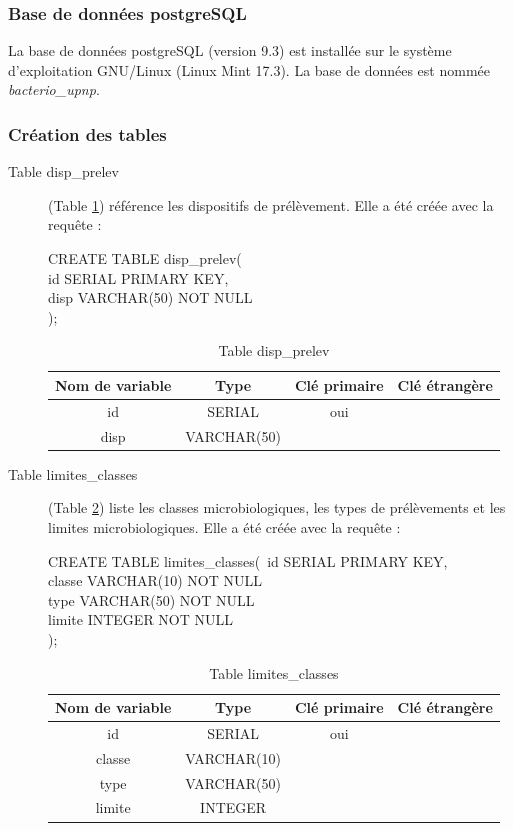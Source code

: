 \documentclass[12pt,a4paper,oneside]{article}
\begin{document}
 \subsubsection{Base de données postgreSQL}

La base de données postgreSQL (version 9.3) est installée sur le système d'exploitation GNU/Linux (Linux Mint 17.3).
La base de données est nommée \emph{bacterio\_upnp}.


\subsubsection{Création des tables}
\begin{description}
\item[Table disp\_prelev] (Table \ref{disp}) référence les dispositifs de prélèvement. Elle a été créée avec la requête :
\begin{tabbing}
CREATE TABLE disp\_prelev(\\
id SERIAL PRIMARY KEY,\\
disp VARCHAR(50) NOT NULL\\
);
\end{tabbing}
\begin{table}
\caption{Table disp\_prelev \label{disp}}
\begin{center}
\begin{tabular}{|c|c|c|c|}
	\hline
	\textbf{Nom de variable} & \textbf{Type} & \textbf{Clé primaire} & \textbf{Clé étrangère}\\
	\hline
	id & SERIAL & oui &\\
	disp & VARCHAR(50)& &\\
	\hline
\end{tabular}
\end{center}
\end{table}

\item[Table limites\_classes] (Table \ref{classes}) liste les classes microbiologiques, les types de prélèvements et les limites microbiologiques. Elle a été créée avec la requête :
\begin{tabbing}
CREATE TABLE limites\_classes(\
id SERIAL PRIMARY KEY,\\
classe VARCHAR(10) NOT NULL\\
type VARCHAR(50) NOT NULL\\
limite INTEGER NOT NULL\\
);
\end{tabbing}
\begin{table}
\caption{Table limites\_classes \label{classes}}
\begin{center}
\begin{tabular}{|c|c|c|c|}
	\hline
	\textbf{Nom de variable} & \textbf{Type} & \textbf{Clé primaire} & \textbf{Clé étrangère}\\
	\hline
	id & SERIAL & oui &\\
	classe & VARCHAR(10)& &\\
	type & VARCHAR(50)& &\\
	limite & INTEGER & &\\
	\hline
\end{tabular}
\end{center}
\end{table}


\end{description}
\end{document}
